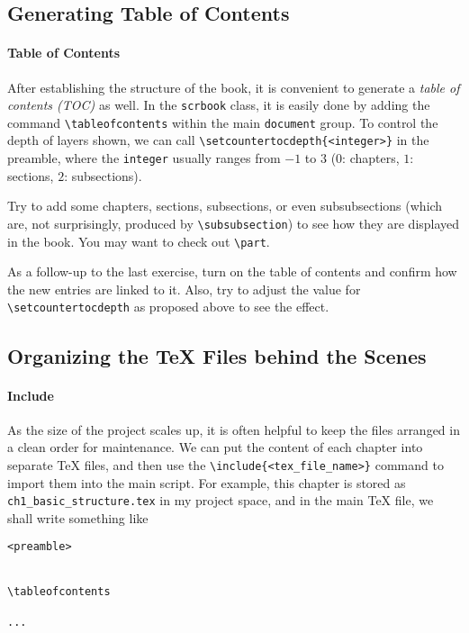 \subsection{Generating Table of Contents}

\paragraph{Table of Contents}
After establishing the structure of the book, it is convenient to generate a \textit{table of contents (TOC)} as well. In the \verb|scrbook| class, it is easily done by adding the command \texttt{\textbackslash tableofcontents} within the main \verb|document| group. To control the depth of layers shown, we can call \texttt{\textbackslash setcounter{tocdepth}\allowbreak\{<integer>\}} in the preamble, where the \verb|integer| usually ranges from $-1$ to $3$ ($0$: chapters, $1$: sections, $2$: subsections).

\begin{exercisebox}
\begin{Exercise}
Try to add some chapters, sections, subsections, or even subsubsections (which are, not surprisingly, produced by \texttt{\textbackslash subsubsection}) to see how they are displayed in the book. You may want to check out \texttt{\textbackslash part}.
\end{Exercise}
\begin{Exercise}
As a follow-up to the last exercise, turn on the table of contents and confirm how the new entries are linked to it. Also, try to adjust the value for \texttt{\textbackslash setcounter{tocdepth}} as proposed above to see the effect.
\end{Exercise}
\end{exercisebox}

\subsection{Organizing the \TeX{} Files behind the Scenes}
\paragraph{Include} As the size of the project scales up, it is often helpful to keep the files arranged in a clean order for maintenance. We can put the content of each chapter into separate \TeX{} files, and then use the \texttt{\textbackslash include\{<tex\_file\_name>\}} command to import them into the main script. For example, this chapter is stored as \texttt{ch1\_basic\_structure.tex} in my project space, and in the main \TeX{} file, we shall write something like
\begin{lstlisting}
<preamble>


\tableofcontents

...

\end{lstlisting}

